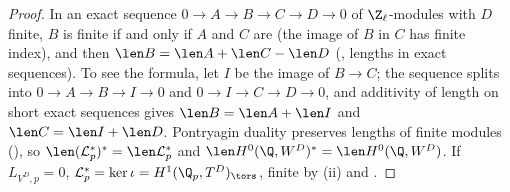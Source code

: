 \begin{proof}
In an exact sequence $0\to A\to B\to C\to D\to0$ of $\Z_\ell$-modules with $D$ finite, $B$ is finite if and only if $A$ and $C$ are (the image of $B$ in $C$ has finite index), and then
$\len B=\len A+\len C-\len D$ (, lengths in exact sequences). To see the formula, let $I$ be the image of $B\to C$; the sequence splits into
$0\to A\to B\to I\to0$ and $0\to I\to C\to D\to0$, and additivity of length on short exact sequences gives $\len B=\len A+\len I$ and $\len C=\len I+\len D$. Pontryagin duality preserves lengths of finite modules (), so
$\len(\mathcal L^*_p)^*=\len\mathcal L^*_p$ and $\len H^0(\Q,W^D)^*=\len H^0(\Q,W^D)$. If $L_{V^D,p}=0$, $\mathcal L^*_p=\ker\iota=H^1(\Q_p,T^D)_{\tors}$, finite by (ii) and
.
\end{proof}


